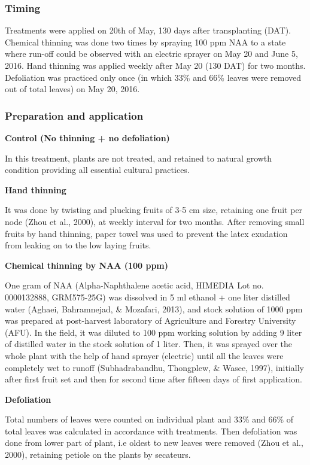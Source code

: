 \documentclass[]{article}
\begin{document}
\subsubsection{Timing}\label{timing}

Treatments were applied on 20th of May, 130 days after transplanting
(DAT). Chemical thinning was done two times by spraying 100 ppm NAA to a
state where run-off could be observed with an electric sprayer on May 20
and June 5, 2016. Hand thinning was applied weekly after May 20 (130
DAT) for two months. Defoliation was practiced only once (in which 33\%
and 66\% leaves were removed out of total leaves) on May 20, 2016.

\subsubsection{Preparation and
application}\label{preparation-and-application}

\textbf{Control (No thinning + no defoliation)}

In this treatment, plants are not treated, and retained to natural
growth condition providing all essential cultural practices.

\textbf{Hand thinning}

It was done by twisting and plucking fruits of 3-5 cm size, retaining
one fruit per node (Zhou et al., 2000), at weekly interval for two
months. After removing small fruits by hand thinning, paper towel was
used to prevent the latex exudation from leaking on to the low laying
fruits.

\textbf{Chemical thinning by NAA (100 ppm)}

One gram of NAA (Alpha-Naphthalene acetic acid, HIMEDIA Lot no.
0000132888, GRM575-25G) was dissolved in 5 ml ethanol + one liter
distilled water (Aghaei, Bahramnejad, \& Mozafari, 2013), and stock
solution of 1000 ppm was prepared at post-harvest laboratory of
Agriculture and Forestry University (AFU). In the field, it was diluted
to 100 ppm working solution by adding 9 liter of distilled water in the
stock solution of 1 liter. Then, it was sprayed over the whole plant
with the help of hand sprayer (electric) until all the leaves were
completely wet to runoff (Subhadrabandhu, Thongplew, \& Wasee, 1997),
initially after first fruit set and then for second time after fifteen
days of first application.

\textbf{Defoliation}

Total numbers of leaves were counted on individual plant and 33\% and
66\% of total leaves was calculated in accordance with treatments. Then
defoliation was done from lower part of plant, i.e oldest to new leaves
were removed (Zhou et al., 2000), retaining petiole on the plants by
secateurs.
\end{document}
